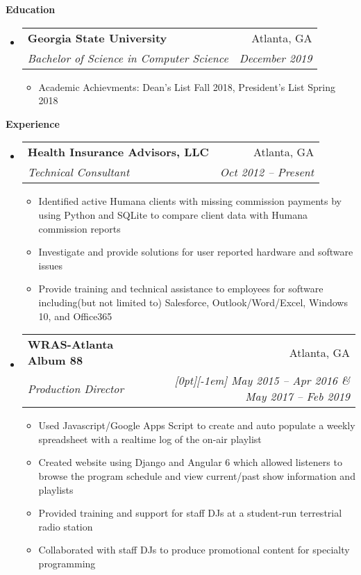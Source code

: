\documentclass[letterpaper,11pt]{article}
\makeatletter
\newcommand{\resitem}[1]{\item #1 \vspace{-2pt}}
\newcommand{\resheading}[1]{{\large \colorbox{mygrey}{\begin{minipage}{\textwidth}{\textbf{#1 \vphantom{p\^{E}}}}\end{minipage}}}}
\newcommand{\ressubheading}[4]{
\begin{tabular*}{6.5in}{l@{\extracolsep{\fill}}r}
    \textbf{#1} & #2 \\
    \textit{#3} & \textit{#4} \\
\end{tabular*}\vspace{-6pt}}
\makeatother
\begin{document}
     \resheading{Education}
    \begin{itemize}[leftmargin=*]
        \item[]
        \ressubheading{Georgia State University}{Atlanta, GA}{Bachelor of Science in Computer Science}{December 2019}
        {\footnotesize
        \begin{itemize}
            \resitem{Academic Achievments: Dean's List Fall 2018, President's List Spring 2018}
        \end{itemize}
        }

    \end{itemize}
    \resheading{Experience}
    \begin{itemize}[leftmargin=*]
        \item[]
        \ressubheading{Health Insurance Advisors, LLC}{Atlanta, GA}
        {Technical Consultant}{Oct 2012 -- Present}
        { \footnotesize
        \begin{itemize}
            \resitem{Identified active Humana clients with missing commission payments by using Python and SQLite to compare client data with Humana commission reports}
            \resitem{Investigate and provide solutions for user reported hardware and software issues}
            \resitem{Provide training and technical assistance to employees for software including(but not limited to) Salesforce, Outlook/Word/Excel, Windows 10, and Office365}
        \end{itemize}
        }
        \item[]
        \ressubheading{WRAS-Atlanta Album 88}%
        {Atlanta, GA}
        {Production Director} {\small  \raisebox{0em}[0pt][-1em]{
        May 2015 -- Apr 2016 \& May 2017 -- Feb 2019}
        }

        {\footnotesize

        \begin{itemize}
            \resitem {Used Javascript/Google Apps Script to create and auto populate a weekly spreadsheet with a realtime log of the on-air playlist}
            \resitem {Created website using Django and Angular 6 which allowed listeners to browse the program schedule and view current/past show information and playlists}
            \resitem {Provided training and support for staff DJs at a student-run terrestrial radio station}
            \resitem {Collaborated with staff DJs to produce promotional content for specialty programming}
        \end{itemize}
        }
    \end{itemize}
\end{document}
